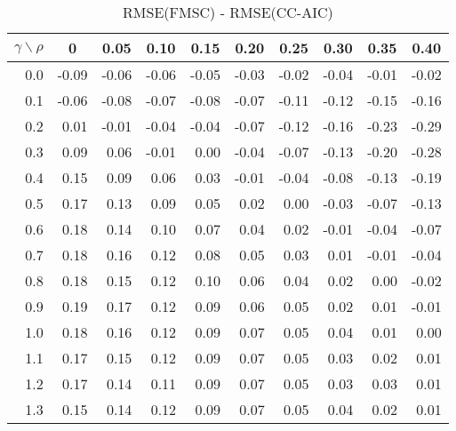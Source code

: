 \documentclass[12pt]{article}
\begin{document}
%
\begin{table}[!tbp]
\caption{RMSE(FMSC) - RMSE(CC-AIC)}
 \begin{center}
 \begin{tabular}{r|rrrrrrrrr}\hline\hline
\multicolumn{1}{c|}{$\gamma\backslash\rho$}&\multicolumn{1}{c}{0}&\multicolumn{1}{c}{0.05}&\multicolumn{1}{c}{0.10}&\multicolumn{1}{c}{0.15}&\multicolumn{1}{c}{0.20}&\multicolumn{1}{c}{0.25}&\multicolumn{1}{c}{0.30}&\multicolumn{1}{c}{0.35}&\multicolumn{1}{c}{0.40}\tabularnewline
\hline

0.0&-0.09&-0.06&-0.06&-0.05&-0.03&-0.02&-0.04&-0.01&-0.02\tabularnewline
0.1&-0.06&-0.08&-0.07&-0.08&-0.07&-0.11&-0.12&-0.15&-0.16\tabularnewline
0.2& 0.01&-0.01&-0.04&-0.04&-0.07&-0.12&-0.16&-0.23&-0.29\tabularnewline
0.3& 0.09& 0.06&-0.01& 0.00&-0.04&-0.07&-0.13&-0.20&-0.28\tabularnewline
0.4& 0.15& 0.09& 0.06& 0.03&-0.01&-0.04&-0.08&-0.13&-0.19\tabularnewline
0.5& 0.17& 0.13& 0.09& 0.05& 0.02& 0.00&-0.03&-0.07&-0.13\tabularnewline
0.6& 0.18& 0.14& 0.10& 0.07& 0.04& 0.02&-0.01&-0.04&-0.07\tabularnewline
0.7& 0.18& 0.16& 0.12& 0.08& 0.05& 0.03& 0.01&-0.01&-0.04\tabularnewline
0.8& 0.18& 0.15& 0.12& 0.10& 0.06& 0.04& 0.02& 0.00&-0.02\tabularnewline
0.9& 0.19& 0.17& 0.12& 0.09& 0.06& 0.05& 0.02& 0.01&-0.01\tabularnewline
1.0& 0.18& 0.16& 0.12& 0.09& 0.07& 0.05& 0.04& 0.01& 0.00\tabularnewline
1.1& 0.17& 0.15& 0.12& 0.09& 0.07& 0.05& 0.03& 0.02& 0.01\tabularnewline
1.2& 0.17& 0.14& 0.11& 0.09& 0.07& 0.05& 0.03& 0.03& 0.01\tabularnewline
1.3& 0.15& 0.14& 0.12& 0.09& 0.07& 0.05& 0.04& 0.02& 0.01\tabularnewline
\hline
\end{tabular}

\end{center}

\end{table}
\end{document}
